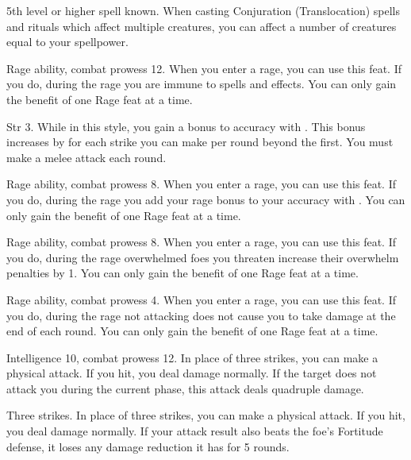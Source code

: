 \featpre 5th level or higher  spell known.
\featben When casting Conjuration (Translocation) spells and rituals which affect multiple creatures, you can affect a number of creatures equal to your spellpower.

\featpres Rage ability, combat prowess 12.
\featben When you enter a rage, you can use this feat. If you do, during the rage you are immune to  spells and effects.
 You can only gain the benefit of one Rage feat at a time.

\featpre Str 3.
\featben While in this style, you gain a  bonus to accuracy with .
This bonus increases by  for each strike you can make per round beyond the first.
\stylereq You must make a melee attack each round.

\featpres Rage ability, combat prowess 8.
\featben When you enter a rage, you can use this feat. If you do, during the rage you add your rage bonus to your accuracy with .
 You can only gain the benefit of one Rage feat at a time.

\featpres Rage ability, combat prowess 8.
\featben When you enter a rage, you can use this feat. If you do, during the rage overwhelmed foes you threaten increase their overwhelm penalties by 1.
 You can only gain the benefit of one Rage feat at a time.

\featpres Rage ability, combat prowess 4.
\featben When you enter a rage, you can use this feat. If you do, during the rage not attacking does not cause you to take damage at the end of each round.
 You can only gain the benefit of one Rage feat at a time.


\featpres Intelligence 10, combat prowess 12.
\featben In place of three strikes, you can make a physical attack.
If you hit, you deal damage normally.
If the target does not attack you during the current phase, this attack deals quadruple damage.

\featpre Three strikes.
\featben In place of three strikes, you can make a physical attack.
If you hit, you deal damage normally.
If your attack result also beats the foe's Fortitude defense, it loses any damage reduction it has for 5 rounds.

